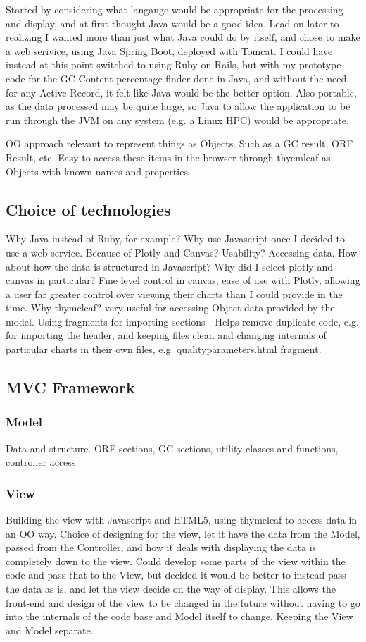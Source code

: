Started by considering what langauge would be appropriate for the processing and display, and at first thought Java would be a good idea. Lead on later to realizing I wanted more than just what Java could do by itself, and chose to make a web serivice, using Java Spring Boot, deployed with Tomcat. I could have instead at this point switched to using Ruby on Rails, but with my prototype code for the GC Content percentage finder done in Java, and without the need for any Active Record, it felt like Java would be the better option. Also portable, as the data processed may be quite large, so Java to allow the application to be run through the JVM on any system (e.g. a Linux HPC) would be appropriate.

OO approach relevant to represent things as Objects. Such as a GC result, ORF Result, etc. Easy to access these items in the browser through thyemleaf as Objects with known names and properties.

\subsection{Choice of technologies}
Why Java instead of Ruby, for example?
Why use Javascript once I decided to use a web service. Because of Plotly and Canvas? Usability? Accessing data. How about how the data is structured in Javascript?
Why did I select plotly and canvas in particular? Fine level control in canvas, ease of use with Plotly, allowing a user far greater control over viewing their charts than I could provide in the time.
Why thymeleaf? very useful for accessing Object data provided by the model. Using fragments for importing sections - Helps remove duplicate code, e.g. for importing the header, and keeping files clean and changing internals of particular charts in their own files, e.g. qualityparameters.html fragment.

\subsection{MVC Framework}
\subsubsection{Model}
Data and structure. ORF sections, GC sections, utility classes and functions, controller access
\subsubsection{View}
Building the view with Javascript and HTML5, using thymeleaf to access data in an OO way.
Choice of designing for the view, let it have the data from the Model, passed from the Controller, and how it deals with displaying the data is completely down to the view. Could develop some parts of the view within the code and pass that to the View, but decided it would be better to instead pass the data as is, and let the view decide on the way of display. This allows the front-end and design of the view to be changed in the future without having to go into the internals of the code base and Model itself to change. Keeping the View and Model separate.
